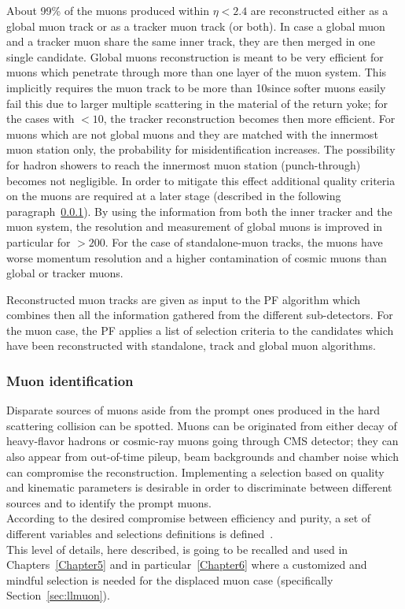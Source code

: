 About 99\% of the muons produced within $\eta < 2.4$ are reconstructed
either as a global muon track or as a tracker muon track (or
both). In case a global muon and a tracker muon share the same inner
track, they are then merged in one single candidate.
Global muons reconstruction is meant to be very efficient for muons
which penetrate
through more than one layer of the muon system. This implicitly
requires the muon track \pt to be more than 10\GeV since softer muons
easily fail this due to larger multiple scattering in the material of the return yoke; for the cases with
\pt$< 10$\GeV, the tracker reconstruction becomes then more efficient.
For muons which are not global muons and
they are matched with the innermost muon station only,
the probability for misidentification increases. The possibility for
hadron showers to reach the innermost muon station (punch-through)
becomes not negligible. In order to mitigate this effect additional
quality criteria on the muons are required at a later stage (described
in the following paragraph~\ref{sec:c2muonselection}).
By using the information from both the
inner tracker and the muon
system, the \pt resolution and measurement of global muons is improved
in particular for \pt $> 200$\GeV. For the case of standalone-muon
tracks, the muons have worse momentum resolution and a higher
contamination of cosmic muons than global or tracker muons.

Reconstructed muon tracks are given as input to the PF algorithm which
combines then all the information gathered from the different
sub-detectors. For the muon case, the PF applies a list of selection criteria
to the candidates which have been reconstructed with standalone, track
and global muon algorithms. 

\subsubsection{Muon identification}\label{sec:c2muonselection}

Disparate sources of muons aside from the
prompt ones produced in the hard scattering collision can be spotted.
Muons can be
originated from either decay of heavy-flavor
hadrons or cosmic-ray muons going through CMS detector; they can also appear from out-of-time pileup, beam
backgrounds and chamber noise which can compromise the reconstruction.
Implementing a selection based on quality and 
kinematic parameters is desirable in order to discriminate between different sources and to identify the
prompt muons.\\
According to the desired compromise between efficiency and purity, a
set of different variables and selections definitions is defined~\cite{Sirunyan_2018_muon}.\\
This level of details, here described, is going to be recalled and
used in Chapters~\ref{Chapter5} and in particular~\ref{Chapter6} where a customized and mindful selection is needed
for the displaced muon case (specifically Section~\ref{sec:llmuon}).

